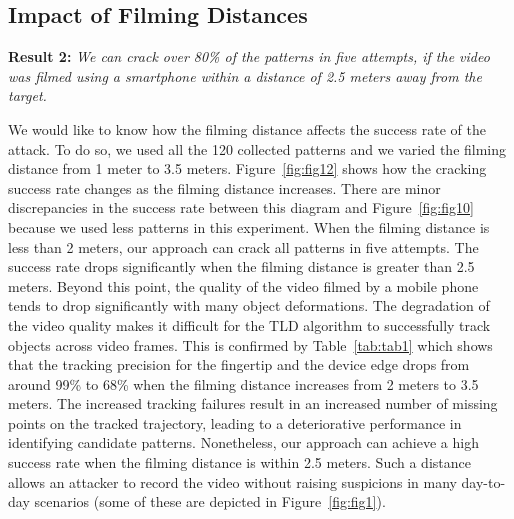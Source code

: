    \vspace{-3mm}
    \subsection{Impact of Filming Distances \label{sec:distances}}
        \noindent \textbf{Result 2:} \emph{We can crack over 80\% of the patterns in five attempts, if the video was filmed using a smartphone within a distance of 2.5 meters away from the target.}

           We would like to know how the filming distance affects the
           success rate of the attack. To do so, we used all the 120 collected patterns and we varied the
           filming distance from 1 meter to 3.5 meters.
           Figure~\ref{fig:fig12} shows how the cracking success rate changes
           as the filming distance increases. There are minor discrepancies in the success rate between this diagram and Figure~\ref{fig:fig10}
            because we used less patterns in this experiment.
           When the filming distance is less than 2 meters, our approach can crack all patterns in five attempts.
           The success rate drops significantly when
           the filming distance is greater than 2.5 meters.
           Beyond this point, the quality of the video filmed by a mobile phone tends to drop significantly with many object deformations. The degradation of the video quality makes it difficult for the TLD algorithm to successfully track objects across video frames.
            This is confirmed by Table~\ref{tab:tab1}
           which shows that the tracking precision for the fingertip and the device edge drops from around 99\% to
           68\% when the filming
           distance increases from 2 meters to 3.5 meters. The increased
           tracking failures result in an increased number of missing
           points on the tracked trajectory, leading to a deteriorative performance in identifying candidate patterns.
           Nonetheless, our approach can
           achieve a high success rate when the filming distance is within
           2.5 meters. Such a distance allows an attacker to
           record the video without raising suspicions in many day-to-day scenarios (some of these are
           depicted in Figure~\ref{fig:fig1}).

